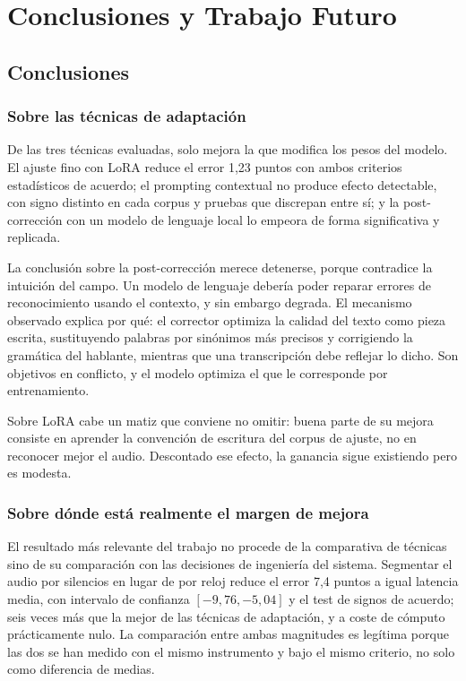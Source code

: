 \chapter{Conclusiones y Trabajo Futuro}
\label{cap:conclusiones}

\section{Conclusiones}

\subsection{Sobre las técnicas de adaptación}

De las tres técnicas evaluadas, solo mejora la que modifica los pesos del modelo. El
ajuste fino con LoRA reduce el error 1,23 puntos con ambos criterios estadísticos de
acuerdo; el prompting contextual no produce efecto detectable, con signo distinto en cada
corpus y pruebas que discrepan entre sí; y la post-corrección con un modelo de lenguaje
local lo empeora de forma significativa y replicada.

La conclusión sobre la post-corrección merece detenerse, porque contradice la intuición
del campo. Un modelo de lenguaje debería poder reparar errores de reconocimiento usando el
contexto, y sin embargo degrada. El mecanismo observado explica por qué: el corrector
optimiza la calidad del texto como pieza escrita, sustituyendo palabras por sinónimos más
precisos y corrigiendo la gramática del hablante, mientras que una transcripción debe
reflejar lo dicho. Son objetivos en conflicto, y el modelo optimiza el que le corresponde
por entrenamiento.

Sobre LoRA cabe un matiz que conviene no omitir: buena parte de su mejora consiste en
aprender la convención de escritura del corpus de ajuste, no en reconocer mejor el audio.
Descontado ese efecto, la ganancia sigue existiendo pero es modesta.

\subsection{Sobre dónde está realmente el margen de mejora}

El resultado más relevante del trabajo no procede de la comparativa de técnicas sino de su
comparación con las decisiones de ingeniería del sistema. Segmentar el audio por silencios
en lugar de por reloj reduce el error 7,4 puntos a igual latencia media, con intervalo de
confianza $[-9{,}76, -5{,}04]$ y el test de signos de acuerdo; seis veces más que la mejor de
las técnicas de adaptación, y a coste de cómputo prácticamente nulo. La comparación entre
ambas magnitudes es legítima porque las dos se han medido con el mismo instrumento y bajo el
mismo criterio, no solo como diferencia de medias.

